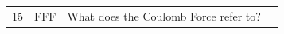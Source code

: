 \documentclass[10pt]{article}
\begin{document}
\begin{tiny}
\begin{longtable}{|r|p{0.375in}|p{1.275in}|p{3.5in}|}
15 &          FFF &                                                                                                                                                                                                                                            What does the Coulomb Force refer to? &                                                                                                                                                                                                                                                                                                                                                                                                                                                                                                                                                                                                                                                                                                                                                                                                                                                                                                                                                                                                                                                                                                                                                                                                                                                                                                                                                                                                                                                                                                                                                                                                                                                                                                                                                                                                                                                                                                                                                                                                                                                                                                                                                                                                                                                                                                                                                                                                                                                                                                                                                                                                                                                                                                                                                                                                                                                                                                                                                                                                                                                                                               
\end{longtable}
\end{tiny}
\end{document}
